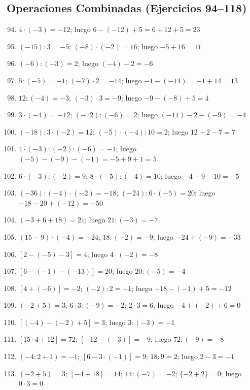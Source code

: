 \documentclass[12pt, letterpaper]{article}
\begin{document}
\subsection*{Operaciones Combinadas (Ejercicios 94--118)}

\begin{enumerate}[leftmargin=*, label=\textbf{\arabic*.}]
  \setcounter{enumi}{93}
  \item $4 \cdot (-3) = -12$; luego $6 - (-12) + 5 = 6 + 12 + 5 = 23$
  \item $(-15) : 3 = -5$; $(-8) \cdot (-2) = 16$; luego $-5 + 16 = 11$
  \item $(-6) : (-3) = 2$; luego $(-4) - 2 = -6$
  \item $5 : (-5) = -1$; $(-7) \cdot 2 = -14$; luego $-1 - (-14) = -1 + 14 = 13$
  \item $12 : (-4) = -3$; $(-3) \cdot 3 = -9$; luego $-9 - (-8) + 5 = 4$
  \item $3 \cdot (-4) = -12$; $(-12) : (-6) = 2$; luego $(-11) - 2 - (-9) = -4$
  \item $(-18) : 3 \cdot (-2) = 12$; $(-5) \cdot (-4) : 10 = 2$; luego $12 + 2 - 7 = 7$
  \item $4 \cdot (-3) : (-2) : (-6) = -1$; luego $(-5) - (-9) - (-1) = -5 + 9 + 1 = 5$
  \item $6 \cdot (-3) : (-2) = 9$; $8 \cdot (-5) : (-4) = 10$; luego $-4 + 9 - 10 = -5$
  \item $(-36) : (-4) \cdot (-2) = -18$; $(-24) : 6 \cdot (-5) = 20$; luego $-18 - 20 + (-12) = -50$
  \item $(-3 + 6 + 18) = 21$; luego $21 : (-3) = -7$
  \item $(15 - 9) \cdot (-4) = -24$; $18 : (-2) = -9$; luego $-24 + (-9) = -33$
  \item $[2 - (-5) - 3] = 4$; luego $4 \cdot (-2) = -8$
  \item $[6 - (-1) - (-13)] = 20$; luego $20 : (-5) = -4$
  \item $[4 + (-6)] = -2$; $(-2) : 2 = -1$; luego $-18 - (-1) + 5 = -12$
  \item $(-2 + 5) = 3$; $6 \cdot 3 : (-9) = -2$; $2 \cdot 3 = 6$; luego $-4 + (-2) + 6 = 0$
  \item $[(-4) - (-2) + 5] = 3$; luego $3 : (-3) = -1$
  \item $[15 \cdot 4 + 12] = 72$; $[-12 - (-3)] = -9$; luego $72 : (-9) = -8$
  \item $(-4 : 2 + 1) = -1$; $[6 - 3 \cdot (-1)] = 9$; $18 : 9 = 2$; luego $2 - 3 = -1$
  \item $(-2 + 5) = 3$; $[-4 + 18] = 14$; $14 : (-7) = -2$; $\{-2 + 2\} = 0$; luego $0 \cdot 3 = 0$

\end{enumerate}
\end{document}
